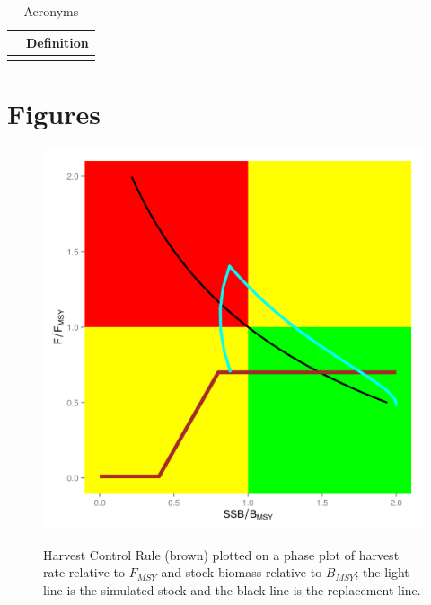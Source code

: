 \documentclass[%
nonumbib,      %
%
]{nrc1}                          %
\begin{document}
\begin{table}[h!]
  \label{tab:acronyms}
  \caption{Acronyms}  
  \begin{center}
    \begin{tabular}{ l p{10cm} }
    \hline 
     & Definition \\ 
    \hline 
       &  \\ 
    \hline 
    \end{tabular}
  \end{center}
\end{table}



\newpage\clearpage
\section*{Figures}

\begin{figure}[htbp]
\centering
\includegraphics[width=6in]{hcr.png}
\label{fig:hcr}
\caption{Harvest Control Rule (brown) plotted on a phase plot of harvest rate relative to $F_{MSY}$ and stock biomass relative to $B_{MSY}$;
the light line is the simulated stock and the black line is the replacement line.}
\end{figure}
\end{document}
